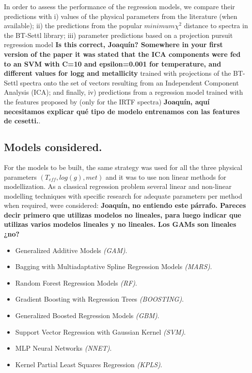 In order to assess the performance of the regression models, we
compare their predictions with i) values of the physical parameters
from the literature (when available); ii) the predictions from the
popular $minimum \chi^2$ distance to spectra in the BT-Settl library;
iii) parameter predictions based on a projection pursuit regression
model {\bf Is this correct, Joaquín? Somewhere in your first version
of the paper it was stated that the ICA components were fed to an SVM
with C=10 and epsilon=0.001 for temperature, and different values for
logg and metallicity} trained with projections of the BT-Settl spectra
onto the set of vectors resulting from an Independent Component
Analysis (ICA); and finally, iv) predictions from a regression model
trained with the features proposed by \cite{cesetti} (only for the
IRTF spectra) {\bf Joaquín, aquí necesitamos explicar qué tipo de
modelo entrenamos con las features de cesetti.}.

\subsection{Models considered.}
\label {ssub:models}
For the models to be built, the same strategy was used for all the
three physical parameters $(T_{eff}, log(g), met)$ and it was to use
non linear methods for modellization.  As a classical regression
problem several linear and non-linear modelling techniques with
specific research for adequate parameters per method when required,
were considered: {\bf Joaquín, no entiendo este párrafo. Pareces decir
primero que utilizas modelos no lineales, para luego indicar que
utilizas varios modelos lineales y no lineales. Los GAMs son lineales
¿no?}

\begin{itemize}
 \item {Generalized Additive Models \emph{(GAM)}.}
 \item {Bagging with Multiadaptative Spline Regression Models \emph{(MARS)}.}
 \item {Random Forest Regression Models \emph{(RF)}.} 
 \item {Gradient Boosting with Regression Trees \emph{(BOOSTING)}.}
 \item {Generalized Boosted Regression Models \emph{(GBM)}.}
 \item {Support Vector Regression with Gaussian Kernel \emph{(SVM)}.}
 \item {MLP Neural Networks \emph{(NNET)}.}
 \item {Kernel Partial Least Squares Regression \emph{(KPLS)}.}
 \end{itemize}



